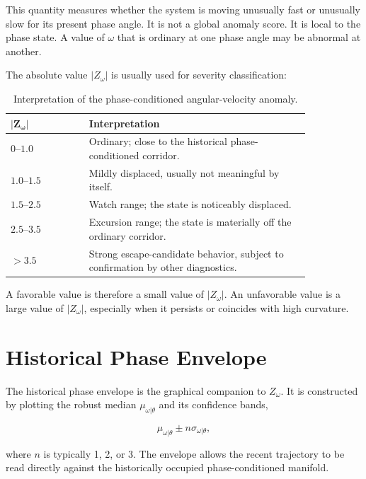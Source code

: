\documentclass[11pt]{article}
\begin{document}
This quantity measures whether the system is moving unusually fast or unusually slow for its present phase angle. It is not a global anomaly score. It is local to the phase state. A value of \(\omega\) that is ordinary at one phase angle may be abnormal at another.

The absolute value \(|Z_{\omega}|\) is usually used for severity classification:

\begin{table}[H]
\centering
\caption{Interpretation of the phase-conditioned angular-velocity anomaly.}
\begin{tabular}{>{\raggedleft\arraybackslash}p{0.22\linewidth} p{0.62\linewidth}}
\toprule
\(\boldsymbol{|Z_{\omega}|}\) & Interpretation \\
\midrule
\(0\)--\(1.0\) & Ordinary; close to the historical phase-conditioned corridor. \\
\(1.0\)--\(1.5\) & Mildly displaced, usually not meaningful by itself. \\
\(1.5\)--\(2.5\) & Watch range; the state is noticeably displaced. \\
\(2.5\)--\(3.5\) & Excursion range; the state is materially off the ordinary corridor. \\
\(>3.5\) & Strong escape-candidate behavior, subject to confirmation by other diagnostics. \\
\bottomrule
\end{tabular}
\end{table}

A favorable value is therefore a small value of \(|Z_{\omega}|\). An unfavorable value is a large value of \(|Z_{\omega}|\), especially when it persists or coincides with high curvature.

\section{Historical Phase Envelope}

The historical phase envelope is the graphical companion to \(Z_{\omega}\). It is constructed by plotting the robust median \(\mu_{\omega|\theta}\) and its confidence bands,

\begin{equation}
\mu_{\omega|\theta} \pm n\sigma_{\omega|\theta},
\end{equation}

where \(n\) is typically 1, 2, or 3. The envelope allows the recent trajectory to be read directly against the historically occupied phase-conditioned manifold.
\end{document}

